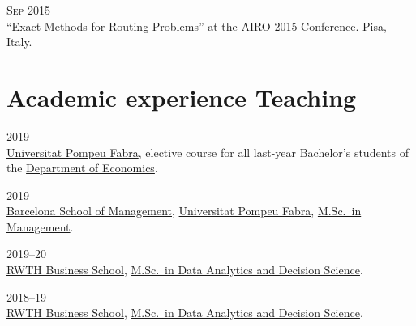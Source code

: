 \begin{paracol}{2}
  \textsc{Sep 2015}
\switchcolumn
  \\
  ``Exact Methods for Routing Problems'' at the \href{http://web.archive.org/web/20150924164917/http://www.airo.org/conferences/airo2015/}{AIRO 2015} Conference.
  Pisa, Italy.
\end{paracol}

\section*{Academic experience {\small Teaching}}

\begin{paracol}{2}
  \textsc{2019}
\switchcolumn
  \\
  \href{https://www.upf.edu/}{Universitat Pompeu Fabra}, elective course for all last-year Bachelor's students of the \href{https://www.upf.edu/web/econ/}{Department of Economics}.
\end{paracol}

\begin{paracol}{2}
  \textsc{2019}
\switchcolumn
  \\
  \href{https://www.barcelonaschoolofmanagement.upf.edu/en}{Barcelona School of Management}, \href{https://www.upf.edu}{Universitat Pompeu Fabra}, \href{https://www.barcelonaschoolofmanagement.upf.edu/en/master-of-science-in-management-specialization-in-business-analytics/study-plan}{M.Sc.\ in Management}.
\end{paracol}

\begin{paracol}{2}
  \textsc{2019--20}
\switchcolumn
  \\
  \href{https://www.business-school.rwth-aachen.de/en/}{RWTH Business School}, \href{https://www.business-school.rwth-aachen.de/en/programs/degree-programs/mme-dds/overview}{M.Sc.\ in Data Analytics and Decision Science}.
\end{paracol}

\begin{paracol}{2}
  \textsc{2018--19}
\switchcolumn
  \\
  \href{https://www.business-school.rwth-aachen.de/en/}{RWTH Business School}, \href{https://www.business-school.rwth-aachen.de/en/programs/degree-programs/mme-dds/overview}{M.Sc.\ in Data Analytics and Decision Science}.
\end{paracol}

